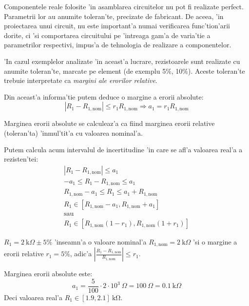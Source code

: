 Componentele reale folosite 'in asamblarea circuitelor nu pot fi realizate perfect. Parametrii lor au anumite toleran'te, precizate de fabricant. De aceea, 'in proiectarea unui circuit, nu este important'a numai verificarea func'tion'arii dorite, ci 'si comportarea circuitului pe 'intreaga gam'a de varia'tie a parametrilor respectivi, impus'a de tehnologia de realizare a componentelor.

'In cazul exemplelor analizate 'in aceast'a lucrare, rezistoarele sunt realizate cu anumite toleran'te, marcate pe element (de exemplu 5\%, 10\%). Aceste toleran'te trebuie interpretate ca \textit{margini ale erorilor relative}.

Din aceast'a informa'tie putem deduce o margine a erorii absolute:
\begin{equation*}
\left|R_1-R_{1,\mathrm{nom}}\right| \leq r_1R_{1,\mathrm{nom}} \Longrightarrow a_1 = r_1R_{1,\mathrm{nom}}
\end{equation*}

\begin{retine}
  \label{retine3}
  \index{}
    Marginea erorii absolute se calculeaz'a ca fiind marginea erorii relative (toleran'ta) 'inmul'tit'a cu valoarea nominal'a. 
\end{retine}

Putem calcula acum intervalul de incertitudine 'in care se afl'a valoarea real'a a rezisten'tei:
\begin{align*}
\left|R_1-R_{1,\mathrm{nom}}\right| \leq a_1 \\
-a_1 \leq R_1 - R_{1,\mathrm{nom}} \leq a_1 \\
R_{1,\mathrm{nom}} - a_1 \leq R_1 \leq a_1 + R_{1,\mathrm{nom}} \\
R_1 \in [R_{1,\mathrm{nom}}-a_1, R_{1,\mathrm{nom}} + a_1] \\
\text{sau} \\
R_1 \in [R_{1,\mathrm{nom}}(1-r_1), R_{1,\mathrm{nom}}(1+r_1)]
\end{align*}

\begin{example}[]
  $R_1 = 2~\mathrm{k}\Omega \pm 5\%$ 'inseamn'a o valoare nominal'a $R_{1,\mathrm{nom}}=2~\mathrm{k}\Omega$ 'si o margine a erorii relative $r_1=5\%$, adic'a $\left|\frac{R_1-R_{1,\mathrm{nom}}}{R_{1,\mathrm{nom}}}\right| \leq r_1$.
 
  Marginea erorii absolute este:
   \begin{equation*}
    	a_1 = \frac{5}{100}\cdot 2 \cdot 10^3~\Omega = 100~\Omega = 0.1~\mathrm{k}\Omega
  \end{equation*}
  Deci valoarea real'a $R_1 \in [1.9, 2.1]~\mathrm{k\Omega}$.
\end{example}

